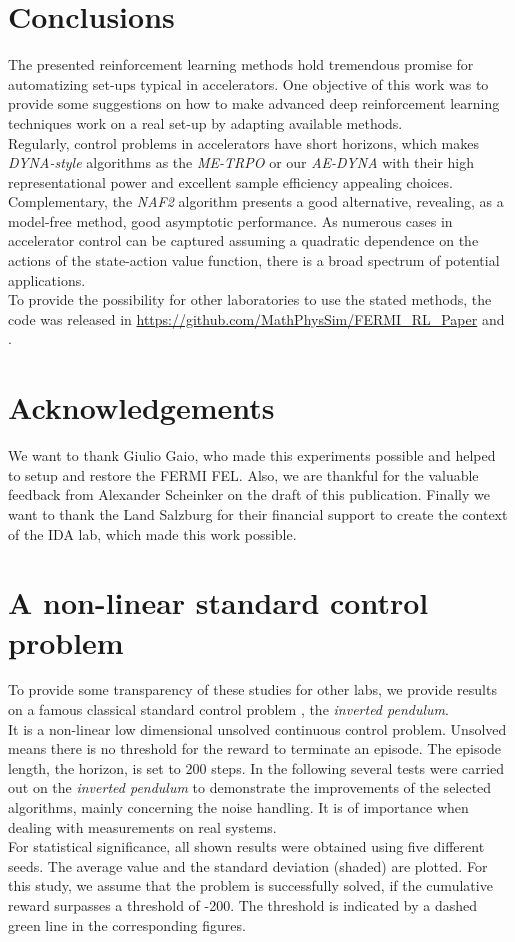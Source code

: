 \documentclass[
reprint,
amsmath,amssymb,amsfonts,clevref,
aps,
prstab,
]{revtex4-2}
\begin{document}
\section{Conclusions}
 The presented reinforcement learning methods hold tremendous promise for automatizing set-ups typical in accelerators. One objective of this work was to provide some suggestions on how to make advanced deep reinforcement learning techniques work on a real set-up by adapting available methods.\\
Regularly, control problems in accelerators have short horizons, which makes \emph{DYNA-style} algorithms as the \emph{ME-TRPO} or our \emph{AE-DYNA} with their high representational power and excellent sample efficiency appealing choices.\\
Complementary, the \emph{NAF2} algorithm presents a good alternative, revealing, as a model-free method, good asymptotic performance. As numerous cases in accelerator control can be captured assuming a quadratic dependence on the actions of the state-action value function, there is a broad spectrum of potential applications.\\
To provide the possibility for other laboratories to use the stated methods, the code was released in \url{https://github.com/MathPhysSim/FERMI_RL_Paper} and \cite{Hirlaender2020b}.
 
 \section{Acknowledgements}
 We want to thank Giulio Gaio, who made this experiments possible and helped to setup and restore the FERMI FEL. Also, we are thankful for the valuable feedback from Alexander Scheinker on the draft of this publication. Finally we want to thank the Land Salzburg for their financial support to create the context of the IDA lab, which made this work possible.

\appendix
\section{A non-linear standard control problem}
To provide some transparency of these studies for other labs, we provide results on a famous classical standard control problem \cite{Furutaa}, the \emph{inverted pendulum}.\\
It is a non-linear low dimensional unsolved continuous control problem. Unsolved means there is no threshold for the reward to terminate an episode. The episode length, the horizon, is set to 200 steps. In the following several tests were carried out on the \emph{inverted pendulum} to demonstrate the improvements of the selected algorithms, mainly concerning the noise handling. It is of importance when dealing with measurements on real systems.\\
For statistical significance, all shown results were obtained using five different seeds. The average value and the standard deviation (shaded) are plotted. For this study, we assume that the problem is successfully solved, if the cumulative reward surpasses a threshold of -200. The threshold is indicated by a dashed green line in the corresponding figures.
\end{document}
